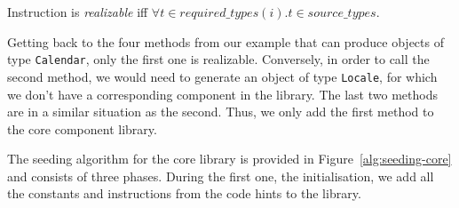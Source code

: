 \documentclass[sigconf,review,anonymous]{acmart}
\begin{document}



\begin{definition}\label{def:realizable}
Instruction  is {\em realizable} iff $\forall t \in required\_types(i). t \in source\_types$.
  
\end{definition}

Getting back to the four methods from our example that can produce objects of type \texttt{Calendar}, only the first one is realizable. Conversely, in order to call the second method, we would need to generate an object of type \texttt{Locale},
for which we don't have a corresponding component in the library.
The last two methods are in a similar situation as the second. Thus, we only add the first method to the core component library.


The seeding algorithm for the core library is provided in Figure~\ref{alg:seeding-core} and consists of three phases.
During the first one, the initialisation, we add all the constants and instructions from the code hints to the library.
\end{document}
